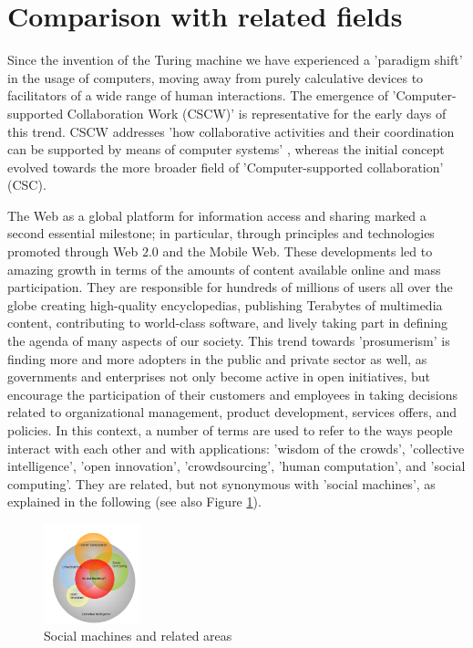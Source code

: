 \documentclass{sig-alternate}
\begin{document}
\section{Comparison with related fields}
\label{sec:comparison}
Since the invention of the Turing machine we have experienced a 'paradigm shift' in the usage of computers, moving away from purely calculative devices to facilitators of a wide range of human interactions. The emergence of 'Computer-supported Collaboration Work (CSCW)' \cite{grudin1994computer} is representative for the early days of this trend. CSCW addresses 'how collaborative activities and their coordination can be supported by means of computer systems' \cite{grudin1994computer}, whereas the initial concept evolved towards the more broader field of 'Computer-supported collaboration' (CSC).

The Web as a global platform for information access and sharing marked a second essential milestone; in particular, through principles and technologies promoted through Web $2.0$ and the Mobile Web. These developments led to amazing growth in terms of the amounts of content available online and mass participation. They are responsible for hundreds of millions of users all over the globe creating high-quality encyclopedias, publishing Terabytes of multimedia content, contributing to world-class software, and lively taking part in defining the agenda of many aspects of our society. This trend towards 'prosumerism' is finding more and more adopters in the public and private sector as well, as governments and enterprises not only become active in open initiatives, but encourage the participation of their customers and employees in taking decisions related to organizational management, product development, services offers, and policies. In this context, a number of terms are used to refer to the ways people interact with each other and with applications: 'wisdom of the crowds', 'collective intelligence', 'open innovation', 'crowdsourcing', 'human computation', and 'social computing'. They are related, but not synonymous with 'social machines', as explained in the following (see also Figure \ref{fig:socialmachine}).

\begin{figure}[htb]
\begin{center}
\includegraphics[width=0.25\textwidth]{img/socialmachinescope.png}
\caption{Social machines and related areas} \label{fig:socialmachine}
\end{center}
\end{figure}
\end{document}
